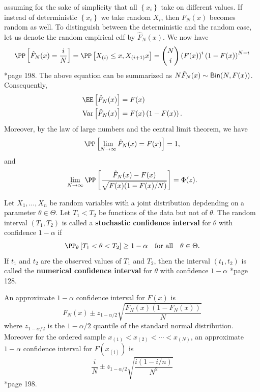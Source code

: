 assuming for the sake of simplicity that all $\left\{ x_i \right\}$ take on different values. If instead of deterministic $\left\{ x_i \right\}$ we take random $X_i$, then $F_N (x)$ becomes random as well. To distinguish between the deterministic and the random case, let us denote the random empirical cdf by $\hat{F}_{N} (x)$. We now have
\begin{equation*}
    \PP \left[ \hat{F}_{N} (x) = \frac{i}{N} \right] = \PP \left[ X_{(i)} \leq x , X_{(i+1)}  x \right] = \binom{N}{i} \left( F(x) \right)^{i} \left( 1 - F(x) \right)^{N-i}
\end{equation*}
\cite{KroeseDirkP2013SMaC}*{page 198}. The above equation can be summarized as $N \hat{F}_{N} (x) \sim {\sf Bin} (N, F(x))$. Consequently,
\begin{align*}
    \EE \left[ \hat{F}_{N} (x) \right]  & = F(x)                          \\
    \Var \left[ \hat{F}_{N} (x) \right] & = F(x) \left( 1 - F(x) \right).
\end{align*}
Moreover, by the law of large numbers and the central limit theorem, we have
\begin{equation*}
    \PP \left[ \lim_{N \to \infty} \hat{F}_{N} (x) = F (x) \right] = 1,
\end{equation*}
and
\begin{equation*}
    \lim_{N \to \infty} \PP \left[ \frac{\hat{F}_{N} (x) - F(x)}{\sqrt{F(x)(1-F(x)/N)}} \right] = \Phi (z).
\end{equation*}

\begin{defe} \label{defe: confd_int}
    Let $X_1 , \ldots , X_n$ be random variables with a joint distribution depdending on a parameter $\theta \in \Theta$. Let $T_1 < T_2$ be functions of the data but not of $\theta$. The random interval $(T_1 , T_2)$ is called a {\bf stochastic confidence interval} for $\theta$ with confidence $1 - \alpha$ if
    \begin{equation*}
        \PP_{\theta} \left[ T_1 < \theta < T_2 \right] \geq 1 - \alpha \quad \text{for all} \quad \theta \in \Theta.
    \end{equation*}
    If $t_1$ and $t_2$ are the observed values of $T_1$ and $T_2$, then the interval $(t_1 , t_2)$ is called the {\bf numerical confidence interval} for $\theta$ with confidence $1 - \alpha$ \cite{KroeseDirkP2013SMaC}*{page 128}.
\end{defe}

An approximate $1 - \alpha$ confidence interval for $F(x)$ is
\begin{equation*}
    F_N (x) \pm z_{1 - \alpha / 2} \sqrt{\frac{F_N (x) (1 - F_N (x))}{N}}
\end{equation*}
where $z_{1 - \alpha / 2}$ is the $1 - \alpha / 2$ quantile of the standard normal distribution. Moreover for the ordered sample $x_{(1)} < x_{(2)} < \cdots < x_{(N)}$, an approximate $1 - \alpha$ confidence interval for $F(x_{(i)})$ is
\begin{equation*}
    \frac{i}{N} \pm z_{1 - \alpha / 2} \sqrt{\frac{i(1 - i/n)}{N^2}}
\end{equation*}
\cite{KroeseDirkP2013SMaC}*{page 198}.

